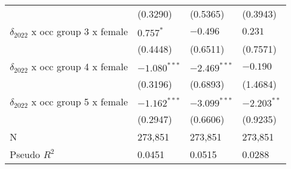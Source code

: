 \begin{tabular}{llll}
                                       &           (0.3290) &           (0.5365) &           (0.3943) \\
$\delta_{2022}$ x occ group 3 x female &          $0.757^*$ &           $-0.496$ &            $0.231$ \\
                                       &           (0.4448) &           (0.6511) &           (0.7571) \\
$\delta_{2022}$ x occ group 4 x female &     $-1.080^{***}$ &     $-2.469^{***}$ &           $-0.190$ \\
                                       &           (0.3196) &           (0.6893) &           (1.4684) \\
$\delta_{2022}$ x occ group 5 x female &     $-1.162^{***}$ &     $-3.099^{***}$ &      $-2.203^{**}$ \\
                                       &           (0.2947) &           (0.6606) &           (0.9235) \\
\midrule
N                                      &            273,851 &            273,851 &            273,851 \\
Pseudo $R^2$                           &             0.0451 &             0.0515 &             0.0288 \\
\bottomrule
\end{tabular}
